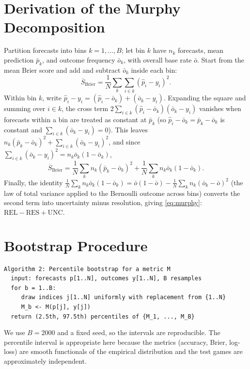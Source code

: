 \documentclass[11pt]{article}
\begin{document}
\section{Derivation of the Murphy Decomposition}
Partition forecasts into bins $k=1,\dots,B$; let bin $k$ have $n_k$ forecasts,
mean prediction $\bar p_k$, and outcome frequency $\bar o_k$, with overall base
rate $\bar o$. Start from the mean Brier score and add and subtract $\bar o_k$
inside each bin:
\[
\overline{S}_{\mathrm{Brier}}
= \frac1N\sum_k \sum_{i \in k}(\hat p_i - y_i)^2 .
\]
Within bin $k$, write $\hat p_i - y_i = (\hat p_i - \bar o_k) + (\bar o_k - y_i)$.
Expanding the square and summing over $i \in k$, the cross term
$2\sum_{i\in k}(\hat p_i-\bar o_k)(\bar o_k - y_i)$ vanishes when forecasts within a
bin are treated as constant at $\bar p_k$ (so $\hat p_i-\bar o_k=\bar p_k-\bar o_k$
is constant and $\sum_{i\in k}(\bar o_k - y_i)=0$). This leaves
$n_k(\bar p_k-\bar o_k)^2 + \sum_{i\in k}(\bar o_k-y_i)^2$, and since
$\sum_{i\in k}(\bar o_k-y_i)^2 = n_k\bar o_k(1-\bar o_k)$,
\[
\overline{S}_{\mathrm{Brier}}
= \frac1N\sum_k n_k(\bar p_k-\bar o_k)^2
+ \frac1N\sum_k n_k\bar o_k(1-\bar o_k).
\]
Finally, the identity
$\frac1N\sum_k n_k\bar o_k(1-\bar o_k) = \bar o(1-\bar o) - \frac1N\sum_k n_k(\bar o_k-\bar o)^2$
(the law of total variance applied to the Bernoulli outcome across bins) converts
the second term into uncertainty minus resolution, giving
\eqref{eq:murphy}: $\mathrm{REL} - \mathrm{RES} + \mathrm{UNC}$.

\section{Bootstrap Procedure}
\begin{verbatim}
Algorithm 2: Percentile bootstrap for a metric M
  input: forecasts p[1..N], outcomes y[1..N], B resamples
  for b = 1..B:
     draw indices j[1..N] uniformly with replacement from {1..N}
     M_b <- M(p[j], y[j])
  return (2.5th, 97.5th) percentiles of {M_1, ..., M_B}
\end{verbatim}
We use $B=2000$ and a fixed seed, so the intervals are reproducible. The
percentile interval is appropriate here because the metrics (accuracy, Brier,
log-loss) are smooth functionals of the empirical distribution and the test games
are approximately independent.
\end{document}
